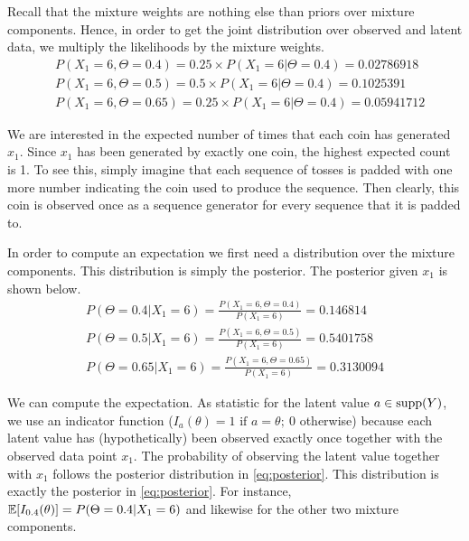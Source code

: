Recall that the mixture weights are nothing else than priors over mixture components. Hence, in order to get the joint distribution over observed and
latent data, we multiply the likelihoods by the mixture weights.
\begin{align}
&P(X_{1}=6,\Theta=0.4) = 0.25 \times P(X_{1}=6|\Theta=0.4) = 0.02786918 \\
&P(X_{1}=6,\Theta=0.5) = 0.5 \times P(X_{1}=6|\Theta=0.4)  = 0.1025391 \nonumber \\ 
&P(X_{1}=6,\Theta=0.65) =  0.25 \times P(X_{1}=6|\Theta=0.4)  = 0.05941712 \nonumber
\end{align}

We are interested in the expected number of times that each coin has generated $ x_{1} $. Since $ x_{1} $ has been generated by exactly one coin,
the highest expected count is 1. To see this, simply imagine that each sequence of tosses is padded with one more number indicating the coin
used to produce the sequence. Then clearly, this coin is observed once as a sequence generator for every sequence that it is padded to.

In order to compute an expectation we first need a distribution over the mixture components. This distribution is simply the posterior. The
posterior given $ x_{1} $ is shown below.
\begin{align}\label{eq:posterior}
P(\Theta=0.4|X_{1}=6) = \frac{P(X_{1}=6,\Theta=0.4)}{P(X_1 = 6)} = 0.146814 \\
P(\Theta=0.5|X_{1}=6) = \frac{P(X_{1}=6,\Theta=0.5)}{P(X_1 = 6)} = 0.5401758 \nonumber \\
P(\Theta=0.65|X_{1}=6) = \frac{P(X_{1}=6,\Theta=0.65)}{P(X_1 = 6)} = 0.3130094 \nonumber
\end{align}

We can compute the expectation. As statistic for the latent value $a \in \operatorname{supp}(Y)$, we use an indicator function ($ I_{a}(\theta) = 1 \mbox{ if } a=\theta;~0 $ otherwise) 
because each latent value has (hypothetically) been observed exactly once
together with the observed data point $ x_{1} $. The probability of observing the latent value together with $ x_{1} $ follows the posterior distribution in \eqref{eq:posterior}. 
This distribution is exactly the posterior in \eqref{eq:posterior}. For instance, $ \mathbb{E}[I_{0.4}(\theta)] = P(\Theta=0.4|X_{1}=6) $ and likewise for the
other two mixture components.

